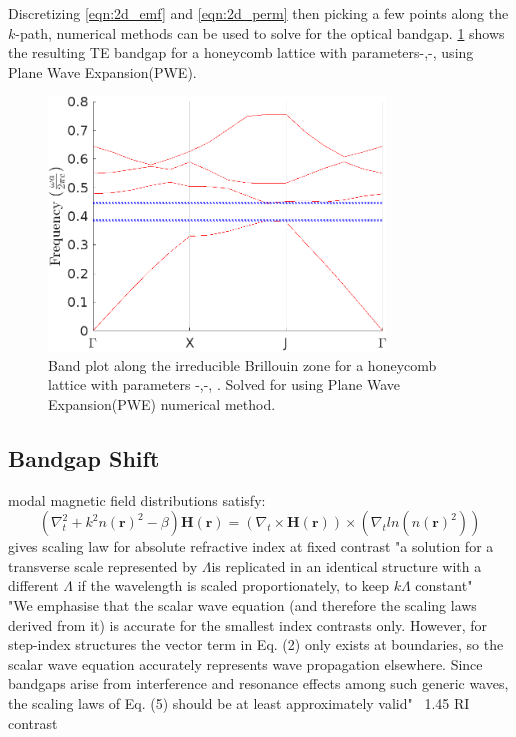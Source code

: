 Discretizing  \ref{eqn:2d_emf} and \ref{eqn:2d_perm} then picking a few points along the $k$-path, numerical methods can be used to solve for the optical bandgap. \ref{fig:2dbp} shows the resulting TE bandgap for a honeycomb lattice with parameters-,-, using Plane Wave Expansion(PWE)\cite{sukhoivanov}. 
\begin{figure}[h]
	\centering
			\includegraphics[width=0.8\textwidth]{./Figures/HCPCF/2D_BandDiagram.png}
	\caption {Band plot along the irreducible Brillouin zone for a honeycomb lattice with parameters -,-, . Solved for using Plane Wave Expansion(PWE) numerical method\cite{sukhoivanov}.} 
	\label{fig:2dbp}
\end{figure}

\clearpage
\subsection{Bandgap Shift}
modal magnetic field distributions satisfy:
\begin{equation}
	(\nabla^2_t + k^2n(\boldsymbol{r})^2 - \beta)\boldsymbol{H(r)} = (\nabla_t\times\boldsymbol{H(r)})\times(\nabla_t ln(n(\boldsymbol{r})^2))
\end{equation}
gives scaling law for absolute refractive index at fixed contrast
"a solution for a transverse scale represented by $\Lambda$is replicated in an identical structure with a different $\Lambda$ if the wavelength is scaled proportionately, to keep $k\Lambda$ constant"\\
"We emphasise that the scalar wave equation (and therefore the scaling laws derived from it) is accurate for the smallest index contrasts only. However, for step-index structures the vector term in Eq. (2) only exists at boundaries, so the scalar wave equation accurately represents wave propagation elsewhere. Since bandgaps arise from interference and resonance effects among such generic waves, the scaling laws of Eq. (5) should be at least approximately valid" ~1.45 RI contrast\cite{birks}

